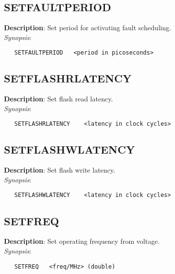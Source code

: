 \subsection{\bf SETFAULTPERIOD}
\label{manpages:SETFAULTPERIOD}
\label{manpages:setfaultperiod}
\vspace{-0.2in}
{\bf Description}: 	Set period for activating fault scheduling.\\[1.5ex]
{\em Synopsis}:
\vspace{-0.2in}
\scriptsize
\begin{verbatim}
   SETFAULTPERIOD   <period in picoseconds>	
\end{verbatim}
\normalsize
\vspace{-0.2in}


\subsection{\bf SETFLASHRLATENCY}
\label{manpages:SETFLASHRLATENCY}
\label{manpages:setflashrlatency}
\vspace{-0.2in}
{\bf Description}: 	Set flash read latency.\\[1.5ex]
{\em Synopsis}:
\vspace{-0.2in}
\scriptsize
\begin{verbatim}
   SETFLASHRLATENCY    <latency in clock cycles>	
\end{verbatim}
\normalsize
\vspace{-0.2in}


\subsection{\bf SETFLASHWLATENCY}
\label{manpages:SETFLASHWLATENCY}
\label{manpages:setflashwlatency}
\vspace{-0.2in}
{\bf Description}: 	Set flash write latency.\\[1.5ex]
{\em Synopsis}:
\vspace{-0.2in}
\scriptsize
\begin{verbatim}
   SETFLASHWLATENCY    <latency in clock cycles>	
\end{verbatim}
\normalsize
\vspace{-0.2in}


\subsection{\bf SETFREQ}
\label{manpages:SETFREQ}
\label{manpages:setfreq}
\vspace{-0.2in}
{\bf Description}: 	Set operating frequency from voltage.\\[1.5ex]
{\em Synopsis}:
\vspace{-0.2in}
\scriptsize
\begin{verbatim}
   SETFREQ   <freq/MHz> (double)	
\end{verbatim}
\normalsize
\vspace{-0.2in}



